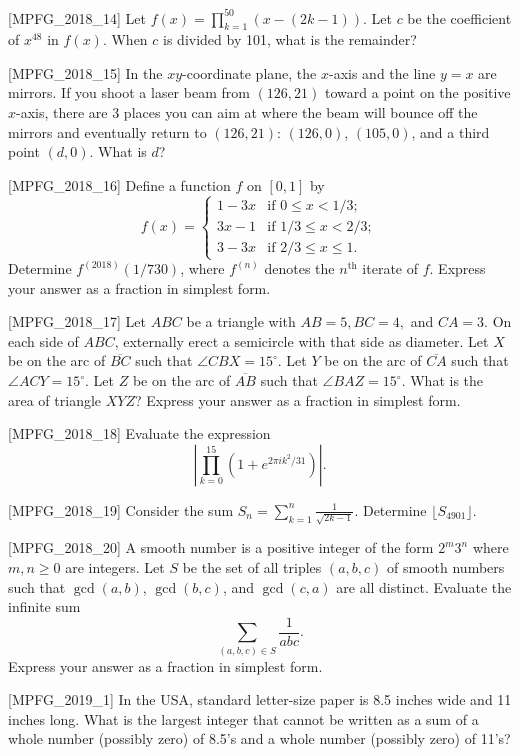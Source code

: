 [MPFG_2018_14]
Let $f(x) = \prod_{k=1}^{50} (x - (2k-1))$. Let $c$ be the coefficient of $x^{48}$ in $f(x)$. When $c$ is divided by 101, what is the remainder?

[MPFG_2018_15]
In the $xy$-coordinate plane, the $x$-axis and the line $y=x$ are mirrors. If you shoot a laser beam from $(126, 21)$ toward a point on the positive $x$-axis, there are 3 places you can aim at where the beam will bounce off the mirrors and eventually return to $(126, 21)$: $(126, 0)$, $(105, 0)$, and a third point $(d, 0)$. What is $d$?

[MPFG_2018_16]
Define a function $f$ on $[0, 1]$ by
$$f(x)=\begin{cases} 1-3x & \text{if } 0 \le x < 1/3; \\ 3x-1 & \text{if } 1/3 \le x < 2/3; \\ 3-3x & \text{if } 2/3 \le x \le 1. \end{cases}$$
Determine $f^{(2018)}(1/730)$, where $f^{(n)}$ denotes the $n^{\text{th}}$ iterate of $f$. Express your answer as a fraction in simplest form.

[MPFG_2018_17]
Let $ABC$ be a triangle with $AB=5, BC=4,$ and $CA=3$. On each side of $ABC$, externally erect a semicircle with that side as diameter. Let $X$ be on the arc of $\overline{BC}$ such that $\angle CBX = 15^\circ$. Let $Y$ be on the arc of $\overline{CA}$ such that $\angle ACY = 15^\circ$. Let $Z$ be on the arc of $\overline{AB}$ such that $\angle BAZ = 15^\circ$. What is the area of triangle $XYZ$? Express your answer as a fraction in simplest form.

[MPFG_2018_18]
Evaluate the expression
$$\left|\prod_{k=0}^{15} \left(1 + e^{2\pi i k^2 / 31}\right)\right|.$$

[MPFG_2018_19]
Consider the sum $S_n = \sum_{k=1}^n \frac{1}{\sqrt{2k-1}}$. Determine $\lfloor S_{4901} \rfloor$.

[MPFG_2018_20]
A smooth number is a positive integer of the form $2^m 3^n$ where $m, n \ge 0$ are integers. Let $S$ be the set of all triples $(a, b, c)$ of smooth numbers such that $\gcd(a,b)$, $\gcd(b,c)$, and $\gcd(c,a)$ are all distinct. Evaluate the infinite sum
$$\sum_{(a,b,c)\in S} \frac{1}{abc}.$$
Express your answer as a fraction in simplest form.

[MPFG_2019_1]
In the USA, standard letter-size paper is 8.5 inches wide and 11 inches long. What is the largest integer that cannot be written as a sum of a whole number (possibly zero) of 8.5's and a whole number (possibly zero) of 11's?

